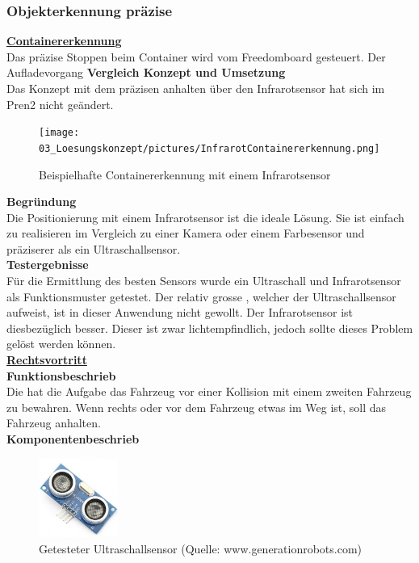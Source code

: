 \subsubsection{Objekterkennung präzise}
\underline{\textbf{Containererkennung}}\\[0.2cm]
Das präzise Stoppen beim Container wird vom Freedomboard gesteuert. Der Aufladevorgang 
\textbf{Vergleich Konzept und Umsetzung}\\[0.2cm]
Das Konzept mit dem präzisen anhalten über den Infrarotsensor hat sich im Pren2 nicht geändert.
\begin{figure} [H]
	\centering
	\texttt{[image: 03\_Loesungskonzept/pictures/InfrarotContainererkennung.png]}
	\caption{Beispielhafte Containererkennung mit einem Infrarotsensor}
\end{figure}
\textbf{Begründung}\\[0.2cm]
Die Positionierung mit einem Infrarotsensor ist die ideale Lösung. Sie ist einfach zu realisieren im Vergleich zu einer Kamera oder einem Farbesensor und präziserer als ein Ultraschallsensor.\\[0.2cm]
\textbf{Testergebnisse}\\[0.2cm]
Für die Ermittlung des besten Sensors wurde ein Ultraschall und Infrarotsensor als Funktionsmuster getestet. Der relativ grosse \grqq, welcher der Ultraschallsensor aufweist, ist in dieser Anwendung nicht gewollt. Der Infrarotsensor ist diesbezüglich besser. Dieser ist zwar lichtempfindlich, jedoch sollte dieses Problem gelöst werden können.\\[0.2cm]
%
\underline{\textbf{Rechtsvortritt}} \\[0.2cm]
\textbf{Funktionsbeschrieb}\\[0.2cm]
Die \grqq{} hat die Aufgabe das Fahrzeug vor einer Kollision mit einem zweiten Fahrzeug zu bewahren. Wenn rechts oder vor dem Fahrzeug etwas im Weg ist, soll das Fahrzeug anhalten.\\[0.2cm]
\textbf{Komponentenbeschrieb}\\[0.2cm]
\begin{figure} [H]
	\centering
	\includegraphics[width=0.23\textwidth]{03_Loesungskonzept/pictures/ultraschallsensor.png}
	\caption{Getesteter Ultraschallsensor (Quelle: www.generationrobots.com)}
\end{figure}
